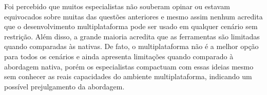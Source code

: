 Foi percebido que muitos especialistas não souberam opinar ou estavam equivocados sobre muitas das questões anteriores e mesmo assim nenhum acredita que o desenvolvimento multiplataforma pode ser usado em qualquer cenário sem restrição. Além 
disso, a grande maioria acredita que as ferramentas são limitadas quando comparadas às nativas. De fato, o multiplataforma não é a melhor opção para todos os cenários e ainda apresenta limitações quando comparado à 
abordagem nativa, porém os especialistas compactuam com essas ideias mesmo sem conhecer as reais capacidades do ambiente multiplataforma, indicando um possível prejulgamento da abordagem.